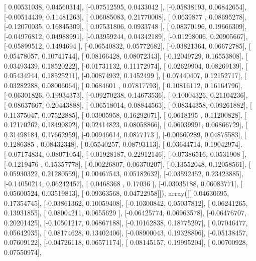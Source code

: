 \documentclass{article}
\begin{document}
       [ 0.00531038,  0.04560314],
       [-0.07512595,  0.0433042 ],
       [-0.05838193,  0.06842654],
       [-0.00514439,  0.11481263],
       [ 0.06085083,  0.21770008],
       [ 0.0639877 ,  0.08695278],
       [-0.12070035,  0.16845309],
       [ 0.07531806,  0.0933748 ],
       [ 0.08370196,  0.19666309],
       [-0.04976812,  0.04988991],
       [-0.03959244,  0.04342189],
       [-0.01298006,  0.20905667],
       [-0.05899512,  0.1494694 ],
       [-0.06540832,  0.05772682],
       [-0.03821364,  0.06672785],
       [ 0.05478057,  0.10741744],
       [ 0.08166428,  0.08072343],
       [-0.12049729,  0.16553808],
       [ 0.03493439,  0.18520222],
       [-0.01731132,  0.11172974],
       [ 0.02629904,  0.08269139],
       [ 0.05434944,  0.18525211],
       [-0.00874932,  0.1452499 ],
       [ 0.07440407,  0.12152717],
       [ 0.03282288,  0.08006064],
       [ 0.0684601 ,  0.07817793],
       [ 0.10816112,  0.16164796],
       [-0.06301826,  0.19934373],
       [-0.09270238,  0.14673536],
       [ 0.10004326,  0.21104236],
       [-0.08637667,  0.20443888],
       [ 0.06518014,  0.08844563],
       [-0.08344358,  0.09261882],
       [ 0.11375047,  0.07522885],
       [ 0.03905958,  0.16292071],
       [ 0.0618195 ,  0.11200828],
       [ 0.12170262,  0.18490892],
       [ 0.02414823,  0.08058866],
       [ 0.06039991,  0.06866729],
       [ 0.31498184,  0.17662959],
       [-0.00946614,  0.0877173 ],
       [-0.00660289,  0.04875583],
       [ 0.1286385 ,  0.08432348],
       [-0.05540257,  0.08793113],
       [-0.03644714,  0.19042974],
       [-0.07174834,  0.08071054],
       [-0.01928187,  0.22912146],
       [-0.07386516,  0.0531908 ],
       [-0.1219476 ,  0.15357778],
       [-0.00226807,  0.06370207],
       [-0.13552048,  0.12058561],
       [ 0.05930322,  0.21280559],
       [ 0.00467543,  0.05182632],
       [-0.03592452,  0.23423885],
       [-0.14050214,  0.06242457],
       [ 0.0468368 ,  0.17036   ],
       [-0.03035188,  0.06083771],
       [ 0.05600524,  0.03519813],
       [ 0.09363568,  0.04722958]]), array([[ 0.04630695,  0.17354745],
       [-0.03861362,  0.10059408],
       [-0.10300842,  0.05037812],
       [ 0.06241265,  0.13931855],
       [ 0.08004211,  0.0655629 ],
       [-0.06425774,  0.06963578],
       [-0.06476707,  0.20201425],
       [-0.10501217,  0.06867188],
       [-0.10162838,  0.18775297],
       [ 0.07046477,  0.05642935],
       [ 0.08174628,  0.13402406],
       [-0.08900043,  0.19328896],
       [-0.05138457,  0.07609122],
       [-0.04726118,  0.06571174],
       [ 0.08145157,  0.19995204],
       [ 0.00700928,  0.07550974],
\end{document}
